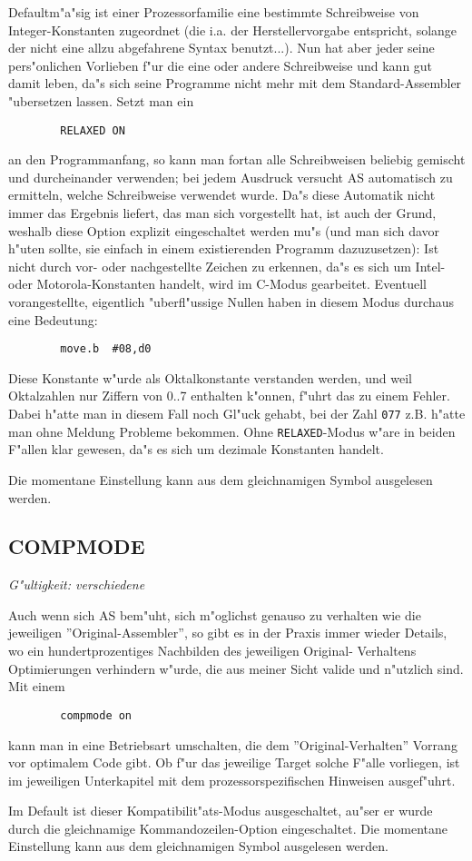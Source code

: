 \documentclass[12pt,a4paper,twoside]{report}
\makeatletter
\newcommand{\tty}[1]{{\tt #1}}
\newcommand{\ttindex}[1]{\index{#1@{\tt #1}}}
\makeatother
\begin{document}
Defaultm"a"sig ist einer Prozessorfamilie eine bestimmte Schreibweise
von Integer-Konstanten zugeordnet (die i.a. der Herstellervorgabe
entspricht, solange der nicht eine allzu abgefahrene Syntax benutzt...).
Nun hat aber jeder seine pers"onlichen Vorlieben f"ur die eine oder
andere Schreibweise und kann gut damit leben, da"s sich seine Programme
nicht mehr mit dem Standard-Assembler "ubersetzen lassen. Setzt man ein
\begin{verbatim}
        RELAXED ON
\end{verbatim}
an den Programmanfang, so kann man fortan alle Schreibweisen beliebig
gemischt und durcheinander verwenden; bei jedem Ausdruck versucht AS
automatisch zu ermitteln, welche Schreibweise verwendet wurde.  Da"s
diese Automatik nicht immer das Ergebnis liefert, das man sich vorgestellt
hat, ist auch der Grund, weshalb diese Option explizit eingeschaltet
werden mu"s (und man sich davor h"uten sollte, sie einfach in einem
existierenden Programm dazuzusetzen): Ist nicht durch vor- oder
nachgestellte Zeichen zu erkennen, da"s es sich um Intel- oder
Motorola-Konstanten handelt, wird im C-Modus gearbeitet.  Eventuell
vorangestellte, eigentlich "uberfl"ussige Nullen haben in diesem Modus
durchaus eine Bedeutung:
\begin{verbatim}
        move.b  #08,d0
\end{verbatim}
Diese Konstante w"urde als Oktalkonstante verstanden werden, und weil
Oktalzahlen nur Ziffern von 0..7 enthalten k"onnen, f"uhrt das zu einem
Fehler.  Dabei h"atte man in diesem Fall noch Gl"uck gehabt, bei der
Zahl \tty{077} z.B. h"atte man ohne Meldung Probleme bekommen.  Ohne
\tty{RELAXED}-Modus w"are in beiden F"allen klar gewesen, da"s es sich
um dezimale Konstanten handelt.
\par
Die momentane Einstellung kann aus dem gleichnamigen Symbol ausgelesen
werden.


\subsection{COMPMODE}
\label{SectCompMode}
\ttindex{COMPMODE}

{\em G"ultigkeit: verschiedene}

Auch wenn sich AS bem"uht, sich m"oglichst genauso zu verhalten wie die
jeweiligen ''Original-Assembler'', so gibt es in der Praxis immer wieder
Details, wo ein hundertprozentiges Nachbilden des jeweiligen Original-
Verhaltens Optimierungen verhindern w"urde, die aus meiner Sicht valide
und n"utzlich sind.  Mit einem
\begin{verbatim}
        compmode on
\end{verbatim}
kann man in eine Betriebsart umschalten, die dem ''Original-Verhalten''
Vorrang vor optimalem Code gibt.  Ob f"ur das jeweilige Target solche
F"alle vorliegen, ist im jeweiligen Unterkapitel mit dem prozessorspezifischen
Hinweisen ausgef"uhrt.
\par
Im Default ist dieser Kompatibilit"ats-Modus ausgeschaltet, au"ser er
wurde durch die gleichnamige Kommandozeilen-Option eingeschaltet. Die
momentane Einstellung kann aus dem gleichnamigen Symbol ausgelesen
werden.
\end{document}
